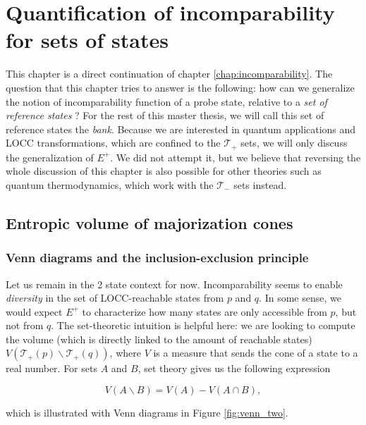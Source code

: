 \chapter{Quantification of incomparability for sets of states} \label{chap:volume}

This chapter is a direct continuation of chapter \ref{chap:incomparability}. The question that this chapter tries to answer is the following: how can we generalize the notion of incomparability function of a probe state, relative to a \textit{set of reference states} ? For the rest of this master thesis, we will call this set of reference states the \textit{bank}. Because we are interested in quantum applications and LOCC transformations, which are confined to the $\mathcal{T}_+$ sets, we will only discuss the generalization of $E^+$. We did not attempt it, but we believe that reversing the whole discussion of this chapter is also possible for other theories such as quantum thermodynamics, which work with the $\mathcal{T}_-$ sets instead.%



\section{Entropic volume of majorization cones}

\subsection{Venn diagrams and the inclusion-exclusion principle}

Let us remain in the 2 state context for now. Incomparability seems to enable \textit{diversity} in the set of LOCC-reachable states from $p$ and $q$. In some sense, we would expect $E^+$ to characterize how many states are only accessible from $p$, but not from $q$. The set-theoretic intuition is helpful here: we are looking to compute the volume (which is directly linked to the amount of reachable states) $V(\mathcal{T}_+(p) \backslash \mathcal{T}_+(q))$, where $V$ is a measure that sends the cone of a state to a real number. For sets $A$ and $B$, set theory gives us the following expression

\begin{equation} \label{eq:2_set_exclusion}
    V(A \backslash B) = V(A) - V(A \cap B),
\end{equation}

\noindent which is illustrated with Venn diagrams in Figure \ref{fig:venn_two}.


